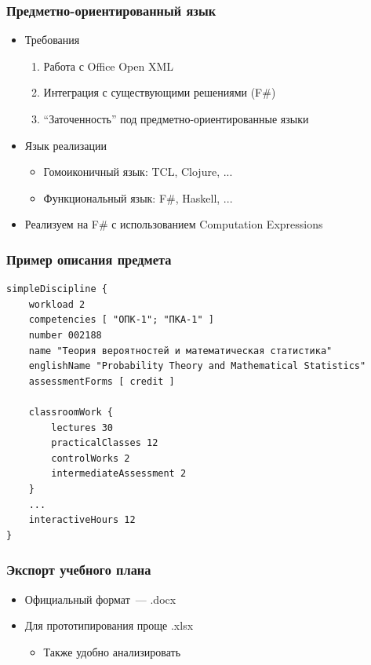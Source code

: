 \documentclass
  [ russian
  , aspectratio=1610 %
  ] {beamer}
\begin{document}
\begin{frame}%
    \frametitle{Предметно-ориентированный язык}

    \begin{itemize}
        \item Требования
              \begin{enumerate}
                  \item Работа с Office Open XML
                  \item Интеграция с существующими решениями (F\#)
                  \item \enquote{Заточенность} под предметно-ориентированные языки
              \end{enumerate}
        \item Язык реализации
              \begin{itemize}
                  \item Гомоиконичный язык: TCL, Clojure, ...
                  \item Функциональный язык: F\#, Haskell, ...
              \end{itemize}
        \item Реализуем на F\# с использованием Computation Expressions
    \end{itemize}
\end{frame}

\begin{frame}[fragile]
    \frametitle{Пример описания предмета}

    \begin{verbatim}
simpleDiscipline {
    workload 2
    competencies [ "ОПК-1"; "ПКА-1" ]
    number 002188
    name "Теория вероятностей и математическая статистика"
    englishName "Probability Theory and Mathematical Statistics"
    assessmentForms [ credit ]

    classroomWork {
        lectures 30
        practicalClasses 12
        controlWorks 2
        intermediateAssessment 2
    }
    ...
    interactiveHours 12
}
      \end{verbatim}

\end{frame}

\begin{frame}
    \frametitle{Экспорт учебного плана}

    \begin{itemize}
        \item Официальный формат~--- .docx
        \item Для прототипирования проще .xlsx
              \begin{itemize}
                  \item Также удобно анализировать
              \end{itemize}
    \end{itemize}

\end{frame}
\end{document}
